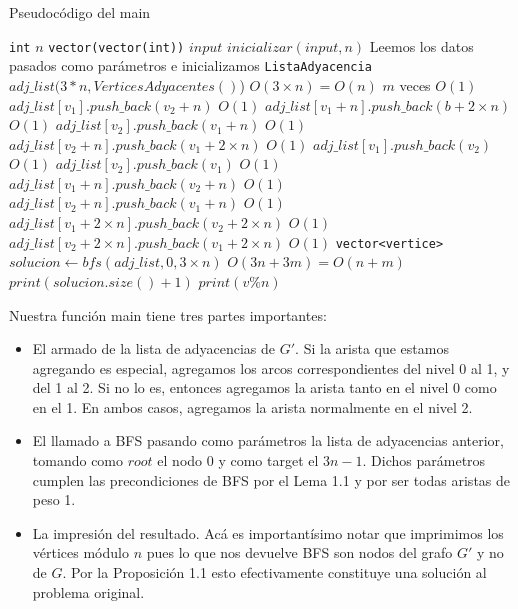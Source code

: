 \begin{algorithm}[H]
  \begin{algorithmic}[1]
  \caption{Pseudocódigo del main}
  \label{algo:1-2}
    	\State \texttt{int} $n$
    	\State \texttt{vector(vector(int))} $input$
    	\normalsize
    	\State $inicializar(input, n)$
    	\Comment \small Leemos los datos pasados como parámetros e inicializamos \normalsize
    	\State \texttt{ListaAdyacencia} $adj\_list(3*n, VerticesAdyacentes()$)
    	\Comment $O(3\times n) = O(n)$
    	\Comment $m$ veces
    		\Comment $O(1)$
    			\State $adj\_list[v_1].push\_back(v_2 + n)$
    			\Comment $O(1)$
    			\State $adj\_list[v_1 + n].push\_back(b + 2\times n)$
    			\Comment $O(1)$
    			\State $adj\_list[v_2].push\_back(v_1 + n)$
    			\Comment $O(1)$
    			\State $adj\_list[v_2 + n].push\_back(v_1 + 2\times n)$
    			\Comment $O(1)$
    		\Else
     			\State $adj\_list[v_1].push\_back(v_2)$
     			\Comment $O(1)$
     			\State $adj\_list[v_2].push\_back(v_1)$
     			\Comment $O(1)$
     			\State $adj\_list[v_1 + n].push\_back(v_2 + n)$
     			\Comment $O(1)$
     			\State $adj\_list[v_2 + n].push\_back(v_1 + n)$
     			\Comment $O(1)$
    		\EndIf
    		\State $adj\_list[v_1 + 2\times n].push\_back(v_2 + 2\times n)$
    		\Comment $O(1)$
    		\State $adj\_list[v_2 + 2\times n].push\_back(v_1 + 2\times n)$
    		\Comment $O(1)$
    	\EndFor
    	\State \texttt{vector<vertice>} $solucion\gets bfs(adj\_list, 0, 3\times n)$
    	\Comment $O(3n + 3m) = O(n + m)$
    	\State $print(solucion.size() + 1)$
    		\State $print(v \% n)$
    	\EndFor
		\EndProcedure
  \end{algorithmic}
  \end{algorithm}

Nuestra función main tiene tres partes importantes:
\begin{itemize}
	\item El armado de la lista de adyacencias de $G'$. Si la arista que estamos agregando es especial, agregamos los arcos correspondientes del nivel 0 al 1, y del 1 al 2. Si no lo es, entonces agregamos la arista tanto en el nivel 0 como en el 1. En ambos casos, agregamos la arista normalmente en el nivel 2.
	\item El llamado a BFS pasando como parámetros la lista de adyacencias anterior, tomando como $root$ el nodo $0$ y como target el $3n-1$. Dichos parámetros cumplen las precondiciones de BFS por el Lema 1.1 y por ser todas aristas de peso 1.
	\item La impresión del resultado. Acá es importantísimo notar que imprimimos los vértices módulo $n$ pues lo que nos devuelve BFS son nodos del grafo $G'$ y no de $G$. Por la Proposición 1.1 esto efectivamente constituye una solución al problema original.
\end{itemize}

